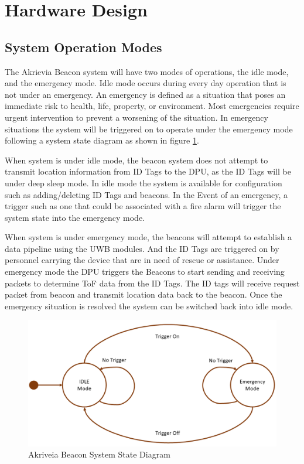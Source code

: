

\setcounter{section}{3}
\section{Hardware Design}
\bigskip
\subsection{System Operation Modes}
\medskip
The Akrievia Beacon system will have two modes of operations, the idle mode, and the emergency mode. Idle mode occurs during every day operation that is not under an emergency. An emergency is defined as a situation that poses an immediate risk to health, life, property, or environment. Most emergencies require urgent intervention to prevent a worsening of the situation. In emergency situations the system will be triggered on to operate under the emergency mode following a system state diagram as shown in figure \ref{sys_state}.

\bigskip
When system is under idle mode, the beacon system does not attempt to transmit location information from ID Tags to the DPU, as the ID Tags will be under deep sleep mode. In idle mode the system is available for configuration such as adding/deleting ID Tags and beacons. In the Event of an emergency, a trigger such as one that could be associated with a fire alarm will trigger the system state into the emergency mode.

\bigskip
When system is under emergency mode, the beacons will attempt to establish a data pipeline using the UWB modules. And the ID Tags are triggered on by personnel carrying the device that are in need of rescue or assistance. Under emergency mode the DPU triggers the Beacons to start sending and receiving packets to determine ToF data from the ID Tags. The ID tags will receive request packet from beacon and transmit location data back to the beacon. Once the emergency situation is resolved the system can be switched back into idle mode.

\medskip
\begin{figure}[H]
\centering
    \includegraphics[width=\linewidth]{./images/state_d.png}
    \caption{Akriveia Beacon System State Diagram}
    \label{sys_state}
\end{figure}
\medskip



